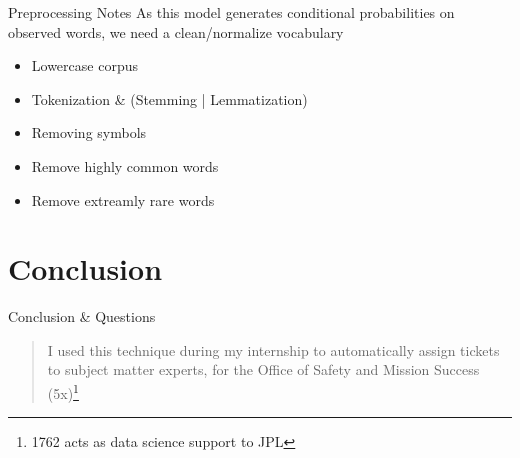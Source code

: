 \documentclass[10pt]{beamer}
\begin{document}
\begin{frame}{Preprocessing Notes}
  As this model generates conditional probabilities on observed words, we need a clean/normalize vocabulary

  \begin{itemize}
  \item Lowercase corpus
  \item Tokenization \& (Stemming | Lemmatization)
  \item Removing symbols
  \item Remove highly common words
  \item Remove extreamly rare words
  \end{itemize}
\end{frame}

\section{Conclusion}

\begin{frame}{Conclusion \& Questions}

  \begin{quote}
    I used this technique during my internship to automatically assign tickets to subject matter experts, for the Office of Safety and Mission Success (5x)\footnote{1762 acts as data science support to JPL}
  \end{quote}

\end{frame}
\end{document}
